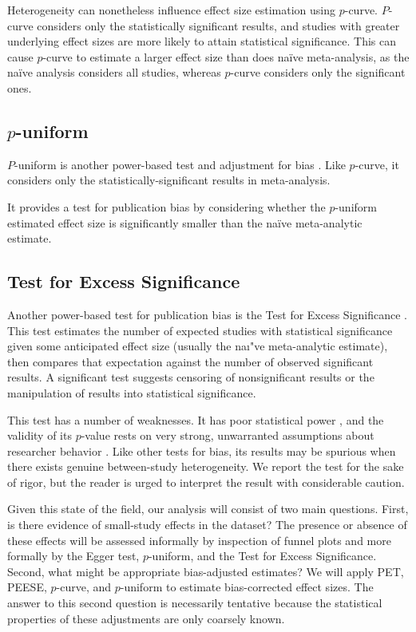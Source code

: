 \documentclass[man, mask]{apa6}
\begin{document}
Heterogeneity can nonetheless influence effect size estimation using $p$-curve. $P$-curve considers only the statistically significant results, and studies with greater underlying effect sizes are more likely to attain statistical significance. This can cause $p$-curve to estimate a larger effect size than does na{\"i}ve meta-analysis, as the na{\"i}ve analysis considers all studies, whereas $p$-curve considers only the significant ones. 

\subsection{$p$-uniform}
$P$-uniform is another power-based test and adjustment for bias \citep{VanAssen:etal:2015}. Like $p$-curve, it considers only the statistically-significant results in meta-analysis. 

It provides a test for publication bias by considering whether the $p$-uniform estimated effect size is significantly smaller than the na{\"i}ve meta-analytic estimate.


\subsection{Test for Excess Significance}
Another power-based test for publication bias is the Test for Excess Significance \citep{Ioannidis:Trikalinos:2007}. This test estimates the number of expected studies with statistical significance given some anticipated effect size (usually the na{\i"}ve meta-analytic estimate), then compares that expectation against the number of observed significant results. A significant test suggests censoring of nonsignificant results or the manipulation of results into statistical significance.

This test has a number of weaknesses. It has poor statistical power \citep{Ioannidis:Trikalinos:2007}, and the validity of its $p$-value rests on very strong, unwarranted assumptions about researcher behavior \citep{Morey:2013}. Like other tests for bias, its results may be spurious when there exists genuine between-study heterogeneity. We report the test for the sake of rigor, but the reader is urged to interpret the result with considerable caution.

Given this state of the field, our analysis will consist of two main questions.  First, is there evidence of small-study effects in the dataset?  The presence or absence of these effects will be assessed informally by inspection of funnel plots and more formally by the Egger test, $p$-uniform, and the Test for Excess Significance.  Second, what might be appropriate bias-adjusted estimates?  We will apply PET, PEESE, $p$-curve, and $p$-uniform to estimate bias-corrected effect sizes.  The answer to this second question is necessarily tentative because the statistical properties of these adjustments are only coarsely known.
\end{document}
